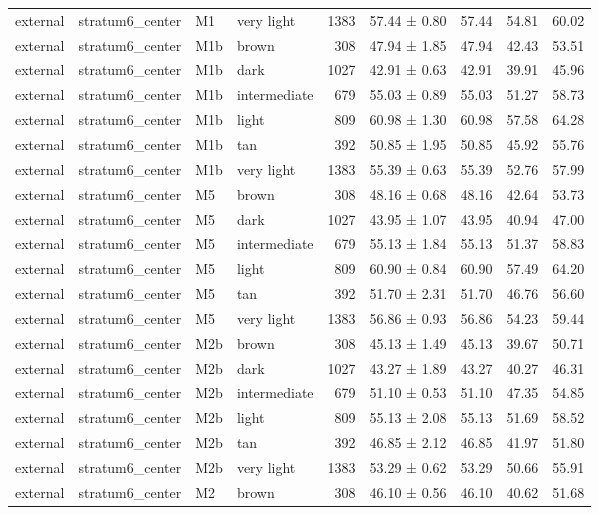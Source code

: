 \begin{tabular}{llllrlrrr}
external & stratum6\_center & M1 & very light & 1383 & 57.44 ± 0.80 & 57.44 & 54.81 & 60.02 \\
external & stratum6\_center & M1b & brown & 308 & 47.94 ± 1.85 & 47.94 & 42.43 & 53.51 \\
external & stratum6\_center & M1b & dark & 1027 & 42.91 ± 0.63 & 42.91 & 39.91 & 45.96 \\
external & stratum6\_center & M1b & intermediate & 679 & 55.03 ± 0.89 & 55.03 & 51.27 & 58.73 \\
external & stratum6\_center & M1b & light & 809 & 60.98 ± 1.30 & 60.98 & 57.58 & 64.28 \\
external & stratum6\_center & M1b & tan & 392 & 50.85 ± 1.95 & 50.85 & 45.92 & 55.76 \\
external & stratum6\_center & M1b & very light & 1383 & 55.39 ± 0.63 & 55.39 & 52.76 & 57.99 \\
external & stratum6\_center & M5 & brown & 308 & 48.16 ± 0.68 & 48.16 & 42.64 & 53.73 \\
external & stratum6\_center & M5 & dark & 1027 & 43.95 ± 1.07 & 43.95 & 40.94 & 47.00 \\
external & stratum6\_center & M5 & intermediate & 679 & 55.13 ± 1.84 & 55.13 & 51.37 & 58.83 \\
external & stratum6\_center & M5 & light & 809 & 60.90 ± 0.84 & 60.90 & 57.49 & 64.20 \\
external & stratum6\_center & M5 & tan & 392 & 51.70 ± 2.31 & 51.70 & 46.76 & 56.60 \\
external & stratum6\_center & M5 & very light & 1383 & 56.86 ± 0.93 & 56.86 & 54.23 & 59.44 \\
external & stratum6\_center & M2b & brown & 308 & 45.13 ± 1.49 & 45.13 & 39.67 & 50.71 \\
external & stratum6\_center & M2b & dark & 1027 & 43.27 ± 1.89 & 43.27 & 40.27 & 46.31 \\
external & stratum6\_center & M2b & intermediate & 679 & 51.10 ± 0.53 & 51.10 & 47.35 & 54.85 \\
external & stratum6\_center & M2b & light & 809 & 55.13 ± 2.08 & 55.13 & 51.69 & 58.52 \\
external & stratum6\_center & M2b & tan & 392 & 46.85 ± 2.12 & 46.85 & 41.97 & 51.80 \\
external & stratum6\_center & M2b & very light & 1383 & 53.29 ± 0.62 & 53.29 & 50.66 & 55.91 \\
external & stratum6\_center & M2 & brown & 308 & 46.10 ± 0.56 & 46.10 & 40.62 & 51.68 \\

\end{tabular}
